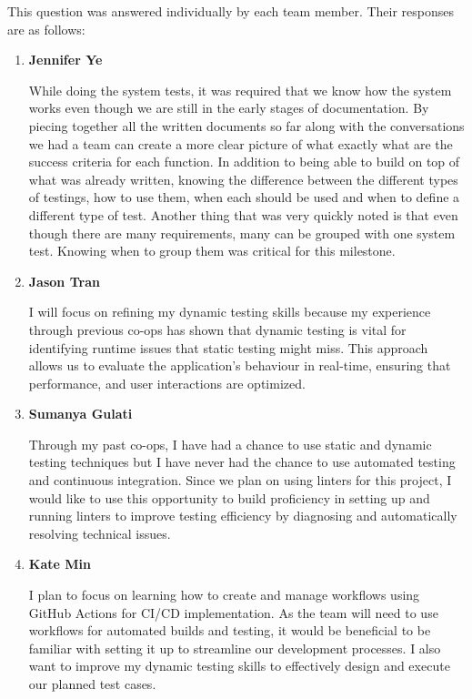 \documentclass[12pt, titlepage]{article}
\begin{document}
\begin{enumerate}
    This question was answered individually by each team member. Their responses
    are as follows:
    \begin{enumerate}
      \item \textbf{Jennifer Ye}
        
        While doing the system tests, it was required that we know how the
        system works even though we are still in the early stages of
        documentation. By piecing together all the written documents so far
        along with the conversations we had a team can create a more clear
        picture of what exactly what are the success criteria for each function.
        In addition to being able to build on top of what was already written,
        knowing the difference between the different types of testings, how to
        use them, when each should be used and when to define a different type
        of test. Another thing that was very quickly noted is that even though
        there are many requirements, many can be grouped with one system test.
        Knowing when to group them was critical for this milestone.

      \item \textbf{Jason Tran}
      
        I will focus on refining my dynamic testing skills because my experience
        through previous co-ops has shown that dynamic testing is vital for
        identifying runtime issues that static testing might miss. This approach
        allows us to evaluate the application's behaviour in real-time, ensuring
        that performance, and user interactions are optimized.

      \item \textbf{Sumanya Gulati}
      
        Through my past co-ops, I have had a chance to use static and dynamic
        testing techniques but I have never had the chance to use automated
        testing and continuous integration. Since we plan on using linters for
        this project, I would like to use this opportunity to build proficiency
        in setting up and running linters to improve testing efficiency by
        diagnosing and automatically resolving technical issues. 

      \item \textbf{Kate Min}
      
        I plan to focus on learning how to create and manage workflows using
        GitHub Actions for CI/CD implementation. As the team will need to use
        workflows for automated builds and testing, it would be beneficial to be
        familiar with setting it up to streamline our development processes. I
        also want to improve my dynamic testing skills to effectively design and
        execute our planned test cases.
    \end{enumerate}


\end{enumerate}
\end{document}
